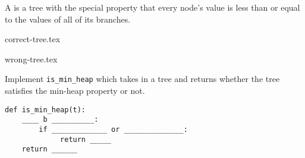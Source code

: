 \begin{blocksection}
\question A  is a tree with the special property that every node's value is
less than or equal to the values of all of its branches.

\vspace{\parskip}
\begin{minipage}{0.5\linewidth}
\centering
{correct-tree.tex}
\end{minipage}
\begin{minipage}{0.5\linewidth}
\centering
{wrong-tree.tex}
\end{minipage}
\vspace{\parskip}

Implement \lstinline$is_min_heap$ which takes in a tree and returns whether the tree satisfies
the min-heap property or not.

\begin{solution}[1.5in]
\begin{lstlisting}
def is_min_heap(t):
    ____ b __________:
        if _____________ or ______________:
             return _____
    return ______
\end{lstlisting}
\end{solution}
\end{blocksection}
